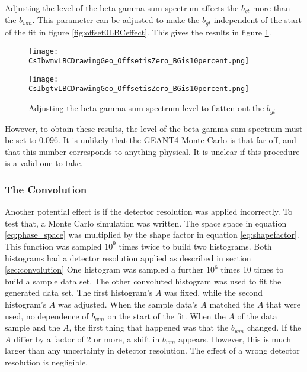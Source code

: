 \documentclass[../MaxHughesThesis.tex]{subfiles}
\begin{document}
Adjusting the level of the beta-gamma sum spectrum affects the $b_{gt}$ more than the $b_{wm}$.
This parameter can be adjusted to make the $b_{gt}$ independent of the start of the fit in figure \ref{fig:offset0LBCeffect}. 
This gives the results in figure \ref{fig:dataoffset0BG10per}. 

\begin{figure}
    \centering
    \begin{minipage}{0.50\textwidth}
        \centerline{\texttt{[image: CsIbwmvLBCDrawingGeo\_OffsetisZero\_BGis10percent.png]}}
    \end{minipage}\hfill
    \begin{minipage}{0.50\textwidth}
        \centerline{\texttt{[image: CsIbgtvLBCDrawingGeo\_OffsetisZero\_BGis10percent.png]}}
    \end{minipage}
    \caption{Adjusting the beta-gamma sum spectrum level to flatten out the $b_{gt}$}
    \label{fig:dataoffset0BG10per}
\end{figure}

However, to obtain these results, the level of the beta-gamma sum spectrum must be set to 0.096. 
It is unlikely that the GEANT4 Monte Carlo is that far off, and that this number corresponds to anything physical.
It is unclear if this procedure is a valid one to take.

\subsubsection{The Convolution}

Another potential effect is if the detector resolution was applied incorrectly.
To test that, a Monte Carlo simulation was written.
The space space in equation \ref{eq:phase_space} was multiplied by the shape factor in equation \ref{eq:shapefactor}.
This function was sampled $10^{9}$ times twice to build two histograms. 
Both histograms had a detector resolution applied as described in section \ref{sec:convolution}
One histogram was sampled a further $10^{6}$ times 10 times to build a sample data set.
The other convoluted histogram was used to fit the generated data set.
The first histogram's $A$ was fixed, while the second histogram's $A$ was adjusted.
When the sample data's $A$ matched the $A$ that were used, no dependence of $b_{wm}$ on the start of the fit.
When the $A$ of the data sample and the $A$, the first thing that happened was that the $b_{wm}$ changed.
If the $A$ differ by a factor of 2 or more, a shift in $b_{wm}$ appears.
However, this is much larger than any uncertainty in detector resolution.
The effect of a wrong detector resolution is negligible. 
\end{document}
